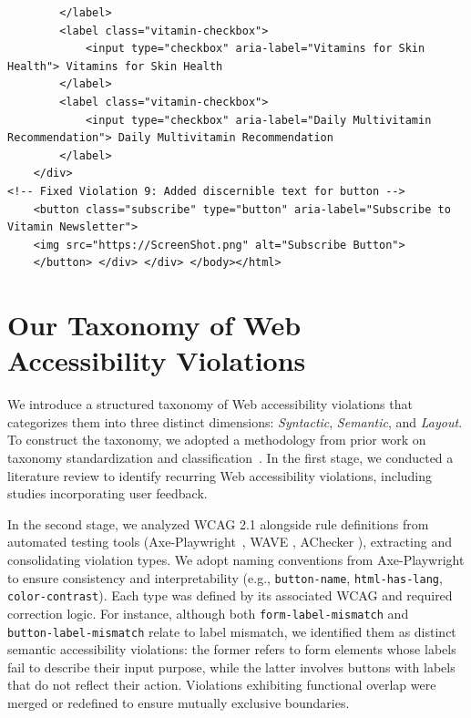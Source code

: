 \documentclass[sigconf, nonacm]{acmart}
\begin{document}
\begin{minipage}[t]{0.50\textwidth}
{\begin{lstlisting}
        </label>
        <label class="vitamin-checkbox">
            <input type="checkbox" aria-label="Vitamins for Skin Health"> Vitamins for Skin Health
        </label>
        <label class="vitamin-checkbox">
            <input type="checkbox" aria-label="Daily Multivitamin Recommendation"> Daily Multivitamin Recommendation
        </label>
    </div>
<!-- Fixed Violation 9: Added discernible text for button -->
    <button class="subscribe" type="button" aria-label="Subscribe to Vitamin Newsletter">
    <img src="https://ScreenShot.png" alt="Subscribe Button">
    </button> </div> </div> </body></html>
\end{lstlisting} }
\end{minipage}


\section{Our Taxonomy of Web Accessibility Violations} \label{sec:taxonomy}
We introduce a structured taxonomy of Web accessibility violations that categorizes them into three distinct dimensions: \emph{Syntactic}, \emph{Semantic}, and \emph{Layout}. To construct the taxonomy, we adopted a methodology from prior work on taxonomy standardization and classification~\cite{vsmite2014empirically, usman2017taxonomies}. 
In the first stage, we conducted a literature review to identify recurring Web accessibility violations, including studies incorporating user feedback. 

In the second stage, we analyzed WCAG 2.1 alongside rule definitions from automated testing tools (Axe-Playwright~\cite{PlaywrightAPI}, WAVE \cite{Webaim2025wave}, AChecker \cite{achecker2024}), extracting and consolidating violation types.  We adopt naming conventions from Axe-Playwright to ensure consistency and interpretability (e.g., \texttt{button-name}, \texttt{html-has-lang}, \texttt{color-contrast}). Each type was defined by its associated WCAG and required correction logic. For instance, although both \texttt{form-label-mismatch} and \\ \texttt{button-label-mismatch} relate to label mismatch, we identified them as distinct semantic accessibility violations: the former refers to form elements whose labels fail to describe their input purpose, while the latter involves buttons with labels that do not reflect their action. Violations exhibiting functional overlap were merged or redefined to ensure mutually exclusive boundaries.
\end{document}
